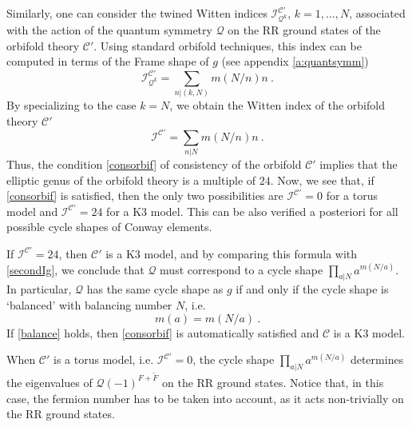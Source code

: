 \documentclass[a4paper,11pt]{article}
\newcommand{\C}{\mathcal{C}}
\newcommand{\I}{\mathcal{I}}
\newcommand{\Q}{\mathcal{Q}}
\numberwithin{equation}{section}
\def\be{\begin{equation}}
\def\ee{\end{equation}}
\begin{document}
\medskip

Similarly, one can consider the twined Witten indices $\I^{\C'}_{\Q^k}$, $k=1,\ldots,N$, associated with the action of the quantum symmetry $\Q$ on the RR ground states of the orbifold theory $\C'$.  Using standard orbifold techniques, this index can be computed  in terms of the Frame shape of $g$ (see appendix \ref{a:quantsymm})
\be\label{Qindex} \I^{\C'}_{\Q^k}=\sum_{n|(k,N)}m(N/n)n\ .
\ee
By specializing to the case $k=N$, we obtain the Witten index of the orbifold theory $\C'$
\be \I^{\C'}=\sum_{n|N}m(N/n)n\ .
\ee Thus, the condition \eqref{consorbif} of consistency of the orbifold $\C'$ implies that the elliptic genus of the orbifold theory is a multiple of $24$.  Now, we see that, if \eqref{consorbif} is satisfied, then the only two possibilities are $\I^{\C'}=0$ for a torus model and $\I^{\C'}=24$ for a K3 model. This can be also verified a posteriori for all possible cycle shapes of Conway elements.

If $\I^{\C'}=24$, then $\C'$ is a K3 model, and by comparing this formula with \eqref{secondIg}, we conclude that $\Q$ must correspond to a cycle shape $\prod_{a|N}a^{m(N/a)}$. In particular, $\Q$ has the same cycle shape as $g$ if and only if the cycle shape is `balanced' with balancing number $N$, i.e.
\be\label{balance} m(a)=m(N/a)\ .
\ee
If \eqref{balance} holds, then \eqref{consorbif} is automatically satisfied and $\C$ is a K3 model.

When $\C'$ is a torus model, i.e. $\I^{\C'}=0$, the cycle shape $\prod_{a|N}a^{m(N/a)}$ determines the eigenvalues of $\Q(-1)^{F+\tilde F}$ on the RR ground states. Notice that, in this case, the fermion number has to be taken into account, as it acts non-trivially on the RR ground states.


\end{document}
